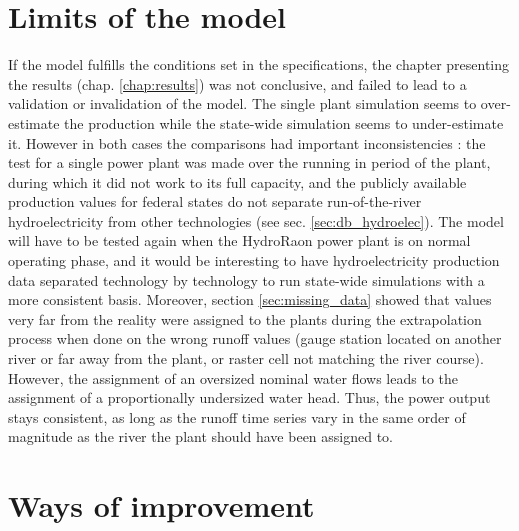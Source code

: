 \section{Limits of the model}
\label{sec:limits}

If the model fulfills the conditions set in the specifications, the chapter presenting the results (chap. \ref{chap:results}) was not conclusive, and failed to lead to a validation or invalidation of the model. The single plant simulation seems to over-estimate the production while the state-wide simulation seems to under-estimate it. However in both cases the comparisons had important inconsistencies : the test for a single power plant was made over the running in period of the plant, during which it did not work to its full capacity, and the publicly available production values for federal states do not separate run-of-the-river hydroelectricity from other technologies (see sec. \ref{sec:db_hydroelec}). The model will have to be tested again when the HydroRaon power plant is on normal operating phase, and it would be interesting to have hydroelectricity production data separated technology by technology to run state-wide simulations with a more consistent basis. \newline
Moreover, section \ref{sec:missing_data} showed that values very far from the reality were assigned to the plants during the extrapolation process when done on the wrong runoff values (gauge station located on another river or far away from the plant, or raster cell not matching the river course). However, the assignment of an oversized nominal water flows leads to the assignment of a proportionally undersized water head. Thus, the power output stays consistent, as long as the runoff time series vary in the same order of magnitude as the river the plant should have been assigned to.

\section{Ways of improvement}
\label{sec:improv}

